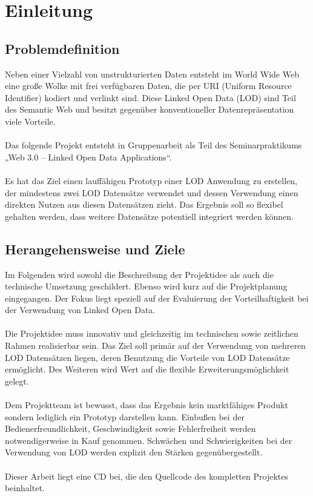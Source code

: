 \documentclass[a4paper, 11pt]{article}
\begin{document}
\tableofcontents
\setcounter{page}{1}
\newpage
\listoffigures
\newpage


\setcounter{page}{1}
\section{Einleitung}
\subsection{Problemdefinition}
Neben einer Vielzahl von unstrukturierten Daten entsteht im World Wide Web eine große Wolke mit frei verfügbaren Daten,  die per URI (Uniform Resource Identifier) kodiert und verlinkt sind. Diese Linked Open Data (LOD) sind Teil des Semantic Web und besitzt gegenüber konventioneller Datenrepräsentation viele Vorteile.\\\\
Das folgende Projekt entsteht in Gruppenarbeit als Teil des Seminarpraktikums „Web 3.0 – Linked Open Data Applications“. \\\\
Es hat das Ziel einen lauffähigen Prototyp einer LOD Anwendung zu erstellen, der mindestens zwei LOD Datensätze verwendet und dessen Verwendung einen direkten Nutzen aus diesen Datensätzen zieht. Das Ergebnis soll so flexibel gehalten werden, dass weitere Datensätze potentiell integriert werden können. 
\subsection{Herangehensweise und Ziele}
Im Folgenden wird sowohl die Beschreibung  der Projektidee als auch die technische Umsetzung geschildert. Ebenso wird kurz auf die Projektplanung eingegangen. Der Fokus liegt speziell auf der Evaluierung der Vorteilhaftigkeit bei der Verwendung von Linked Open Data. \\\\
Die Projektidee muss innovativ und gleichzeitig im technischen sowie zeitlichen Rahmen realisierbar sein. Das Ziel soll primär auf der Verwendung von mehreren LOD Datensätzen liegen, deren Benutzung die Vorteile von LOD Datensätze ermöglicht. Des Weiteren wird Wert auf die flexible Erweiterungsmöglichkeit gelegt. \\\\
Dem Projektteam ist bewusst, dass das Ergebnis kein marktfähiges Produkt sondern lediglich ein Prototyp darstellen kann. Einbußen bei der Bedienerfreundlichkeit, Geschwindigkeit sowie Fehlerfreiheit werden notwendigerweise in Kauf genommen. Schwächen und Schwierigkeiten bei der Verwendung von LOD werden explizit den Stärken gegenübergestellt.\\\\
Dieser Arbeit liegt eine CD bei, die den Quellcode des kompletten Projektes beinhaltet.
\newpage
\end{document}
